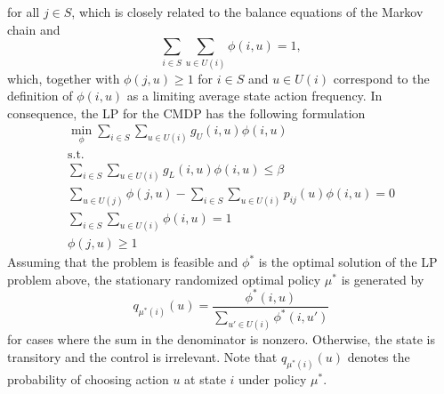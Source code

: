 for all $j \in S$, which is closely related to the balance equations of the Markov chain and
\begin{equation}
\displaystyle\sum_{i\in S}\displaystyle\sum_{u\in U(i)}\phi\left(i,u\right) = 1,
\end{equation}
which, together with $\phi\left(j,u\right) \geq 1$ for $i \in S$ and $u \in U(i)$ correspond to the definition of $\phi\left(i,u\right)$ as a limiting average state action frequency. In consequence, the LP for the CMDP has the following formulation
\begin{equation}\label{CompleteCMDP}
\begin{array}{c}
\min_{\phi} \displaystyle\sum_{i\in S}\displaystyle\sum_{u\in U(i)}g_{U}\left(i,u\right)\phi\left(i,u\right)\\
\text{s.t.}\\
\displaystyle\sum_{i\in S}\displaystyle\sum_{u\in U(i)}g_{L}\left(i,u\right)\phi\left(i,u\right) \leq \beta\\
\displaystyle\sum_{u\in U(j)}\phi\left(j,u\right) - \displaystyle\sum_{i\in S}\displaystyle\sum_{u\in U(i)}p_{ij}\left(u\right)\phi\left(i,u\right) = 0 \\
\displaystyle\sum_{i\in S}\displaystyle\sum_{u\in U(i)}\phi\left(i,u\right) = 1\\
\phi\left(j,u\right) \geq 1
\end{array}
\end{equation}
Assuming that the problem is feasible and $\phi^{*}$ is the optimal solution of the LP problem above, the stationary randomized optimal policy $\mu^{*}$ is generated by
\begin{equation}
q_{\mu^{*}\left(i\right)}\left(u\right)=\displaystyle\frac{\phi^{*}\left(i,u\right)}{\sum_{u' \in U(i)}\phi^{*}\left(i,u'\right)}
\end{equation}
for cases where the sum in the denominator is nonzero. Otherwise, the state is transitory and the control is irrelevant. Note that $q_{\mu^{*}\left(i\right)}\left(u\right)$ denotes the probability of choosing action $u$ at state $i$ under policy $\mu^{*}$.

